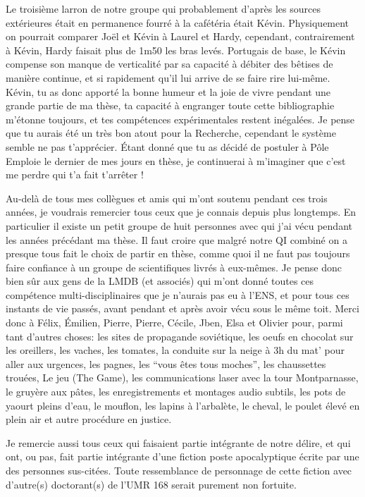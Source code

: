 \documentclass[A4paperpaper,11pt,english]{sphinxmanual}
\begin{document}
Le troisième larron de notre groupe qui probablement d'après les sources
extérieures était en permanence fourré à la cafétéria était Kévin. Physiquement
on pourrait comparer Joël et Kévin à Laurel et Hardy, cependant, contrairement à
Kévin, Hardy faisait plus de 1m50 les bras levés. Portugais de base, le Kévin
compense son manque de verticalité par sa capacité à débiter des bêtises de
manière continue, et si rapidement qu'il lui arrive de se faire rire lui-même.
Kévin, tu as donc apporté la bonne humeur et la joie de vivre pendant une grande
partie de ma thèse, ta capacité à engranger toute cette bibliographie
m'étonne toujours, et tes compétences expérimentales restent inégalées. Je pense
que tu aurais été un très bon atout pour la Recherche, cependant le système
semble ne pas t'apprécier. Étant donné que tu as décidé de postuler à Pôle
Emploie le dernier de mes jours en thèse, je continuerai à m'imaginer que c'est
me perdre qui t'a fait t'arrêter !

Au-delà de tous mes collègues et amis qui m'ont soutenu pendant ces trois
années, je voudrais remercier tous ceux que je connais depuis plus longtemps.
En particulier il existe un petit groupe de huit personnes avec qui j'ai vécu
pendant les années précédant ma thèse. Il faut croire que malgré notre QI
combiné on a presque tous fait le choix de partir en thèse, comme quoi il ne
faut pas toujours faire confiance à un groupe de scientifiques livrés à eux-mêmes.
Je pense donc bien sûr aux gens de la LMDB (et associés) qui m'ont donné
toutes ces compétence multi-disciplinaires que je n'aurais pas eu à l'ENS, et
pour tous ces instants de vie passés, avant pendant et après avoir vécu sous le
même toit. Merci donc à Félix, Émilien, Pierre, Pierre, Cécile, Jben, Elsa et
Olivier pour, parmi tant d'autres choses: les sites de propagande soviétique, les
oeufs en chocolat sur les oreillers, les vaches, les tomates, la conduite sur
la neige à 3h du mat' pour aller aux urgences, les pagnes, les ``vous êtes tous
moches'', les chaussettes trouées, Le jeu (The Game), les communications laser
avec la tour Montparnasse, le gruyère aux pâtes, les enregistrements et montages
audio subtils, les pots de yaourt pleins d'eau, le mouflon, les lapins à
l'arbalète, le cheval, le poulet élevé en plein air et autre procédure en justice.

Je remercie aussi tous ceux qui faisaient partie intégrante de notre délire, et
qui ont, ou pas, fait partie intégrante d'une fiction poste apocalyptique
écrite par une des personnes sus-citées. Toute ressemblance de personnage de
cette fiction avec d'autre(s) doctorant(s) de l'UMR 168 serait purement non
fortuite.
\end{document}
